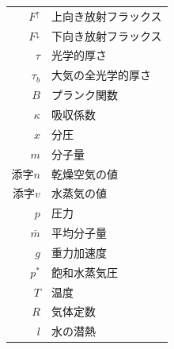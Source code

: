 \documentclass[aspectratio=149,9pt]{beamer}
\begin{document}
\begin{frame}
\begin{columns}
\begin{column}{.8\textwidth}
\begin{itemize}
\begin{itemize}
					\end{itemize}
			\end{itemize}
		\end{column}
		\begin{column}{.2\textwidth}
			\centering\tiny
			\begin{tabular}{rl}
				\hline
				\(F^\uparrow\)&上向き放射フラックス\\
				\(F^\downarrow\)&下向き放射フラックス\\
				\(\tau\)&光学的厚さ\\
				\(\tau_b\)&大気の全光学的厚さ\\
				\(B\)&プランク関数\\
				\(\kappa\)&吸収係数\\
				\(x\)&分圧\\
				\(m\)&分子量\\
				添字\(n\)&乾燥空気の値\\
				添字\(v\)&水蒸気の値\\
				\(p\)&圧力\\
				\(\bar m\)&平均分子量\\
				\(g\)&重力加速度\\
				\(p^*\)&飽和水蒸気圧\\
				\(T\)&温度\\
				\(R\)&気体定数\\
				\(l\)&水の潜熱\\
				\hline
			\end{tabular}
		\end{column}
	\end{columns}
\end{frame}
\end{document}
